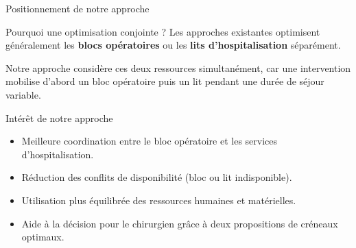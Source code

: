 \begin{frame}{Positionnement de notre approche}

  \begin{block}{Pourquoi une optimisation conjointe ?}
    Les approches existantes optimisent généralement les \textbf{blocs opératoires} ou les \textbf{lits d'hospitalisation} séparément.

    Notre approche considère ces deux ressources simultanément, car une intervention mobilise d'abord un bloc opératoire puis un lit pendant une durée de séjour variable.
  \end{block}

  \vspace{0.5em}

  \begin{block}{Intérêt de notre approche}
    \begin{itemize}
      \item Meilleure coordination entre le bloc opératoire et les services d'hospitalisation.
      \item Réduction des conflits de disponibilité (bloc ou lit indisponible).
      \item Utilisation plus équilibrée des ressources humaines et matérielles.
      \item Aide à la décision pour le chirurgien grâce à deux propositions de créneaux optimaux.
    \end{itemize}
  \end{block}

\end{frame}